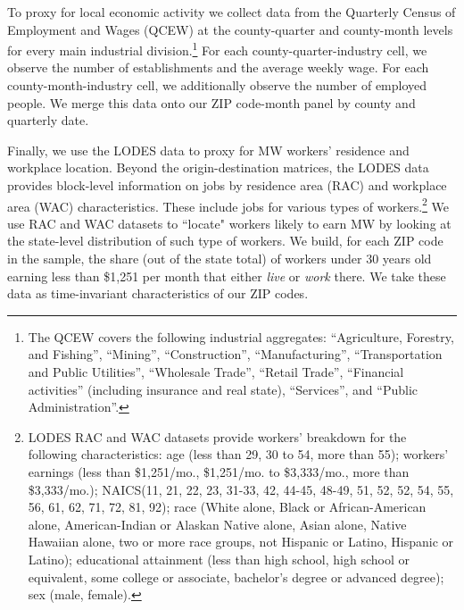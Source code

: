To proxy for local economic activity we collect data from the Quarterly Census of 
Employment and Wages (QCEW) at the county-quarter and county-month levels for every main 
industrial division.\footnote{The QCEW covers the following industrial aggregates: 
	``Agriculture, Forestry, and Fishing'', ``Mining'', ``Construction'', ``Manufacturing'', 
	``Transportation and Public Utilities'', ``Wholesale Trade'', ``Retail Trade'',
	``Financial activities'' (including insurance and real state), ``Services'', and 
	``Public Administration''.} 
For each county-quarter-industry cell, we observe the number of establishments and the 
average weekly wage. For each county-month-industry cell, we additionally observe the number 
of employed people. We merge this data onto our ZIP code-month panel by county and 
quarterly date.


Finally, we use the LODES data to proxy for MW workers' residence and workplace location. 
Beyond the origin-destination matrices, the LODES data provides block-level information on 
jobs by residence area (RAC) and workplace area (WAC) characteristics. These include jobs 
for various types of workers.\footnote{LODES RAC and WAC datasets provide workers' breakdown 
	for the following characteristics: age (less than 29, 30 to 54, more than 55); workers' 
	earnings (less than \$1,251/mo., \$1,251/mo. to \$3,333/mo., more than \$3,333/mo.); 
	NAICS(11, 21, 22, 23, 31-33, 42, 44-45, 48-49, 51, 52, 52, 54, 55, 56, 61, 62, 71, 72, 
	81, 92); race (White alone, Black or African-American alone, American-Indian or Alaskan 	
	Native alone, Asian alone, Native Hawaiian alone, two or more race groups, not Hispanic 
	or Latino, Hispanic or Latino); educational attainment (less than high school, high 
	school or equivalent, some college or associate, bachelor's degree or advanced degree); 
	sex (male, female).} 
We use RAC and WAC datasets to ``locate" workers likely to earn MW by looking at the 
state-level distribution of such type of workers. We build, for each ZIP code in the sample, 
the share (out of the state total) of workers under 30 years old earning less than \$1,251 
per month that either \textit{live} or \textit{work} there. We take these data as 
time-invariant characteristics of our ZIP codes.


